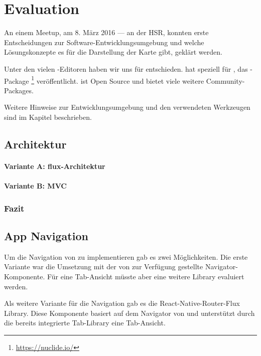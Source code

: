 \chapter{Evaluation}
\label{tb-evaluation}
An einem  Meetup, am 8. März 2016 --- an der HSR, konnten erste Entscheidungen zur Software-Entwicklungsumgebung und welche Lösungskonzepte es für die Darstellung der Karte gibt, geklärt werden.

Unter den vielen -Editoren haben wir uns für  entschieden.
 hat speziell für ,  das -Package \footnote{\url{https://nuclide.io/}} veröffentlicht. 
 ist Open Source und bietet viele weitere Community-Packages.

Weitere Hinweise zur Entwicklungsumgebung und den verwendeten Werkzeugen sind im Kapitel  beschrieben.


\section{Architektur}
\label{tb-evaluation-architektur}


\subsubsection{Variante A: flux-Architektur}


\subsubsection{Variante B: MVC}


\subsection{Fazit}



\section{App Navigation}
Um die Navigation von \kort{} zu implementieren gab es zwei Möglichkeiten. 
Die erste Variante war die Umsetzung mit der von  zur Verfügung gestellte Navigator-Komponente. 
Für eine Tab-Ansicht müsste aber eine weitere Library evaluiert werden. 

Als weitere Variante für die Navigation gab es die React-Native-Router-Flux Library. 
Diese Komponente basiert auf dem Navigator von  und unterstützt durch die bereits integrierte Tab-Library eine Tab-Ansicht.  

